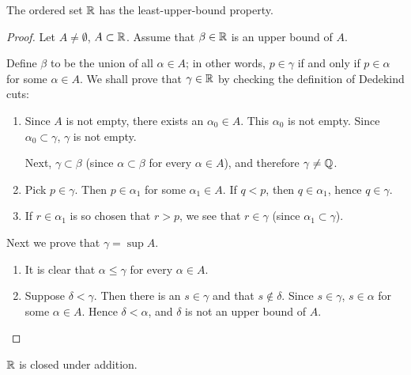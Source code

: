 \begin{proposition}
The ordered set $\mathbb R$ has the least-upper-bound property.
\end{proposition}

\begin{proof}
Let $A\neq\emptyset$, $A\subset\mathbb R$. Assume that $\beta\in\mathbb R$ is an upper bound of $A$.

Define $\beta$ to be the union of all $\alpha\in A$; in other words, $p\in\gamma$ if and only if $p\in\alpha$ for some $\alpha\in A$. We shall prove that $\gamma\in\mathbb R$ by checking the definition of Dedekind cuts:
\begin{enumerate}[label=(\arabic*)]
\item Since $A$ is not empty, there exists an $\alpha_0\in A$. This $\alpha_0$ is not empty. Since $\alpha_0\subset\gamma$, $\gamma$ is not empty.

Next, $\gamma\subset\beta$ (since $\alpha\subset\beta$ for every $\alpha\in A$), and therefore $\gamma\neq\mathbb Q$.

\item Pick $p\in\gamma$. Then $p\in\alpha_1$ for some $\alpha_1\in A$. If $q<p$, then $q\in\alpha_1$, hence $q\in\gamma$.

\item If $r\in\alpha_1$ is so chosen that $r>p$, we see that $r\in\gamma$ (since $\alpha_1\subset\gamma$).
\end{enumerate}

Next we prove that $\gamma=\sup A$.
\begin{enumerate}[label=(\arabic*)]
\item It is clear that $\alpha\le\gamma$ for every $\alpha\in A$.
\item Suppose $\delta<\gamma$. Then there is an $s\in\gamma$ and that $s\notin\delta$. Since $s\in\gamma$, $s\in\alpha$ for some $\alpha\in A$. Hence $\delta<\alpha$, and $\delta$ is not an upper bound of $A$.
\end{enumerate}
\end{proof}

\begin{proposition}
$\mathbb R$ is closed under addition.
\end{proposition}

